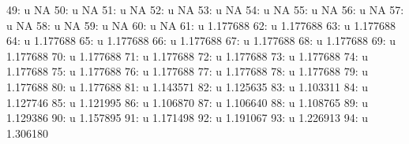 \documentclass[nojss]{jss}
\begin{document}
\begin{Schunk}
\begin{Soutput}
 49:                               u                  NA
 50:                               u                  NA
 51:                               u                  NA
 52:                               u                  NA
 53:                               u                  NA
 54:                               u                  NA
 55:                               u                  NA
 56:                               u                  NA
 57:                               u                  NA
 58:                               u                  NA
 59:                               u                  NA
 60:                               u                  NA
 61:                               u            1.177688
 62:                               u            1.177688
 63:                               u            1.177688
 64:                               u            1.177688
 65:                               u            1.177688
 66:                               u            1.177688
 67:                               u            1.177688
 68:                               u            1.177688
 69:                               u            1.177688
 70:                               u            1.177688
 71:                               u            1.177688
 72:                               u            1.177688
 73:                               u            1.177688
 74:                               u            1.177688
 75:                               u            1.177688
 76:                               u            1.177688
 77:                               u            1.177688
 78:                               u            1.177688
 79:                               u            1.177688
 80:                               u            1.177688
 81:                               u            1.143571
 82:                               u            1.125635
 83:                               u            1.103311
 84:                               u            1.127746
 85:                               u            1.121995
 86:                               u            1.106870
 87:                               u            1.106640
 88:                               u            1.108765
 89:                               u            1.129386
 90:                               u            1.157895
 91:                               u            1.171498
 92:                               u            1.191067
 93:                               u            1.226913
 94:                               u            1.306180

\end{Soutput}
\end{Schunk}
\end{document}
